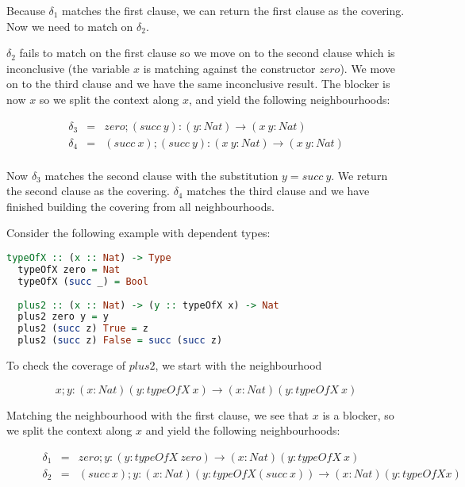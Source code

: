 Because $\delta_1$ matches the first clause, we can return the first clause as the covering. Now we need to match on $\delta_2$.

$\delta_2$ fails to match on the first clause so we move on to the second clause which is inconclusive (the variable $x$ is matching against the constructor $zero$). We move on to the third clause and we have the same inconclusive result. The blocker is now $x$ so we split the context along $x$, and yield the following neighbourhoods:

\begin{figure}[H]
  \begin{equation*}
    \begin{aligned}
      \delta_3 & = & zero; (succ \ y) : (y : Nat) \to (x \ y : Nat) \\
      \delta_4 & = & (succ \ x); (succ \ y) : (x \ y : Nat) \to (x \ y : Nat) \\
    \end{aligned}
  \end{equation*}
\end{figure}

Now $\delta_3$ matches the second clause with the substitution $y = succ \ y$. We return the second clause as the covering. $\delta_4$ matches the third clause and we have finished building the covering from all neighbourhoods.

Consider the following example with dependent types:

\begin{lstlisting}[language=haskell]
  typeOfX :: (x :: Nat) -> Type
  typeOfX zero = Nat
  typeOfX (succ _) = Bool
  
  plus2 :: (x :: Nat) -> (y :: typeOfX x) -> Nat
  plus2 zero y = y
  plus2 (succ z) True = z
  plus2 (succ z) False = succ (succ z)
\end{lstlisting}

To check the coverage of $plus2$, we start with the neighbourhood 

\[
  x;y: (x : Nat)(y : typeOfX \ x) \to (x : Nat)(y : typeOfX \ x)
\]

Matching the neighbourhood with the first clause, we see that $x$ is a blocker, so we split the context along $x$ and yield the following neighbourhoods:

\begin{figure}[H]
  \begin{equation*}
    \begin{aligned}
      \delta_1 & = & zero; y : (y : typeOfX \ zero) \to (x : Nat)(y : typeOfX \ x) \\
      \delta_2 & = & (succ \ x); y : (x : Nat)(y : typeOfX (succ \ x)) \to (x : Nat)(y : typeOfX x) \\
    \end{aligned}
  \end{equation*}
\end{figure}

